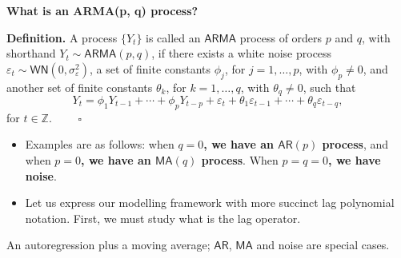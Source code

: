 \documentclass[
  letterpaper,
  DIV=11,
  numbers=noendperiod]{scrartcl}
\newcommand{\slidelabel}[1]{{\color{embernavy}\bfseries\large #1\par\vspace{5pt}}}
\newenvironment{slidefooter}{%
  \par\vspace{7pt}{\color{emberrule}\rule{\linewidth}{0.4pt}}\par\vspace{4pt}%
  \color{emberamber}\itshape\small}{\par}
\begin{document}
\begin{slidebox}

\slidelabel{What is an ARMA(p, q) process?}

\textbf{Definition.} A process \(\{Y_t\}\) is called an
\(\mathsf{ARMA}\) process of orders \(p\) and \(q\), with shorthand
\(Y_t \sim \mathsf{ARMA}(p, q)\), if there exists a white noise process
\(\varepsilon_t \sim \mathsf{WN}\left(0, \sigma_\varepsilon^2\right)\),
a set of finite constants \(\phi_j\), for \(j = 1, \ldots, p\), with
\(\phi_p \neq 0\), and another set of finite constants \(\theta_k\), for
\(k = 1, \ldots, q\), with \(\theta_q \neq 0\), such that
\[Y_t = \phi_1 Y_{t-1} + \cdots + \phi_p Y_{t-p} + \varepsilon_t + \theta_1\varepsilon_{t-1} + \cdots + \theta_q\varepsilon_{t-q},\]
for \(t \in \mathbb{Z}\). \(\qquad\square\)

\begin{itemize}
\item
  Examples are as follows: when \textbf{\(q = 0\), we have an
  \(\mathsf{AR}(p)\) process}, and when \textbf{\(p = 0\), we have an
  \(\mathsf{MA}(q)\) process}. When \textbf{\(p = q = 0\), we have
  noise}.
\item
  Let us express our modelling framework with more succinct lag
  polynomial notation. First, we must study what is the lag operator.
\end{itemize}

\begin{slidefooter}

An autoregression plus a moving average; \(\mathsf{AR}\),
\(\mathsf{MA}\) and noise are special cases.

\end{slidefooter}

\end{slidebox}
\end{document}

